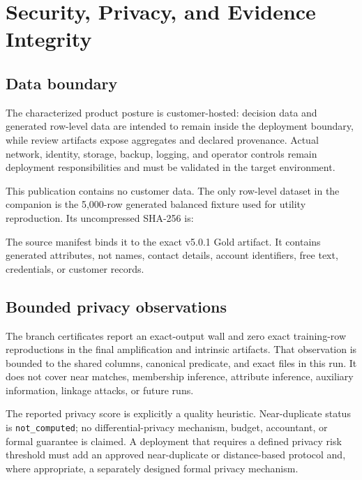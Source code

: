 \section{Security, Privacy, and Evidence Integrity}

\subsection{Data boundary}

The characterized product posture is customer-hosted: decision data and generated row-level data
are intended to remain inside the deployment boundary, while review artifacts expose aggregates
and declared provenance. Actual network, identity, storage, backup, logging, and operator controls
remain deployment responsibilities and must be validated in the target environment.

This publication contains no customer data. The only row-level dataset in the companion is the
5,000-row generated balanced fixture used for utility reproduction. Its uncompressed SHA-256 is:
\begin{center}
\end{center}
The source manifest binds it to the exact v5.0.1 Gold artifact. It contains generated attributes,
not names, contact details, account identifiers, free text, credentials, or customer records.

\subsection{Bounded privacy observations}

The branch certificates report an exact-output wall and zero exact training-row reproductions in
the final amplification and intrinsic artifacts. That observation is bounded to the shared columns,
canonical predicate, and exact files in this run. It does not cover near matches, membership
inference, attribute inference, auxiliary information, linkage attacks, or future runs.

The reported privacy score is explicitly a quality heuristic. Near-duplicate status is
\texttt{not\_computed}; no differential-privacy mechanism, budget, accountant, or formal guarantee
is claimed. A deployment that requires a defined privacy risk threshold must add an approved
near-duplicate or distance-based protocol and, where appropriate, a separately designed formal
privacy mechanism.

